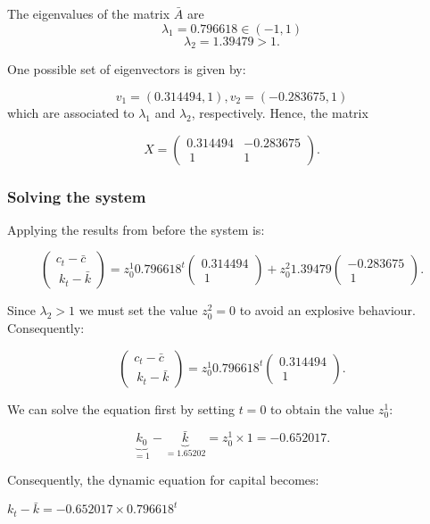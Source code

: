\documentclass[11pt,a4paper,english]{article}
\begin{document}
The eigenvalues of the matrix \(\bar{A}\) are
\[\lambda_{1} = 0.796618 \in (-1,1)\] \[\lambda_{2} =1.39479 > 1.\]

One possible set of eigenvectors is given by:

\[v_{1} = (0.314494 , 1), v_{2} = (-0.283675, 1)\] which are associated
to \(\lambda_{1}\) and \(\lambda_{2}\), respectively. Hence, the matrix

\[X = \begin{pmatrix} 0.314494 & -0.283675 \\\ 1 & 1 \end{pmatrix}.\]

\hypertarget{solving-the-system-1}{%
\subsubsection{Solving the system}\label{solving-the-system-1}}

Applying the results from before the system is:

\[\begin{pmatrix} c_{t} - \bar{c} \\\ k_{t} - \bar{k} \end{pmatrix} = z_{0}^{1} 0.796618^{t} \begin{pmatrix} 0.314494 \\\ 1 \end{pmatrix} + z_{0}^{2} 1.39479 \begin{pmatrix} -0.283675 \\\ 1 \end{pmatrix}.\]

Since \(\lambda_{2} > 1\) we must set the value \(z_{0}^{2} = 0\) to
avoid an explosive behaviour. Consequently:

\[\begin{pmatrix} c_{t} - \bar{c} \\\ k_{t} - \bar{k} \end{pmatrix} = z_{0}^{1} 0.796618^{t} \begin{pmatrix} 0.314494 \\\ 1 \end{pmatrix}.\]

We can solve the equation first by setting \(t=0\) to obtain the value
\(z_{0}^{1}:\)

\[\underbrace{k_{0}}_{=1} - \underbrace{\bar{k}}_{=1.65202} =  z_{0}^{1} \times 1= -0.652017.\]

Consequently, the dynamic equation for capital becomes:

\(k_{t} - \bar{k} = -0.652017 \times 0.796618^{t}\)
\end{document}
